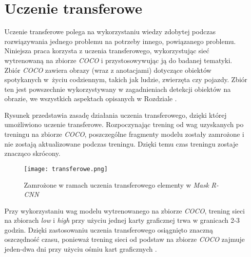 \newpage
\section{Uczenie transferowe}
\label{sec:uczenie-transferowe}

Uczenie transferowe polega na wykorzystaniu wiedzy zdobytej podczas rozwiązywania jednego problemu na potrzeby innego, powiązanego problemu.
Niniejsza praca korzysta z uczenia transferowego, wykorzystując sieć wytrenowaną na zbiorze \textit{COCO} \cite{coco} i przystosowywując ją do badanej tematyki.
Zbiór \textit{COCO} zawiera obrazy (wraz z anotacjami) dotyczące obiektów spotykanych w~życiu codziennym, takich jak ludzie, zwierzęta czy pojazdy. Zbiór ten jest powszechnie wykorzystywany w zagadnieniach detekcji obiektów na obrazie, we wszystkich aspektach opisanych w Rozdziale .

Rysunek  przedstawia zasadę działania uczenia transferowego, dzięki której umożliwiono uczenie transferowe. Rozpoczynając trening od wag uzyskanych po treningu na zbiorze \textit{COCO}, poszczególne fragmenty modelu zostały zamrożone i nie zostają aktualizowane podczas treningu. Dzięki temu czas treningu zostaje znacząco skrócony.

\begin{figure}[h]
  \centering
  \texttt{[image: transferowe.png]}
  \caption{Zamrożone w ramach uczenia transferowego elementy w \textit{Mask R-CNN}}
  \label{fig:transferowe}
\end{figure}

Przy wykorzystaniu wag modelu wytrenowanego na zbiorze \textit{COCO}, trening sieci na zbiorach \textit{low} i \textit{high} przy użyciu jednej karty graficznej trwa w granicach 2-3 godzin. Dzięki zastosowaniu uczenia transferowego osiągnięto znaczną oszczędność czasu, ponieważ trening sieci od podstaw na zbiorze \textit{COCO} zajmuje jeden-dwa dni przy użyciu ośmiu kart graficznych \cite{general-mask-rcnn}.
